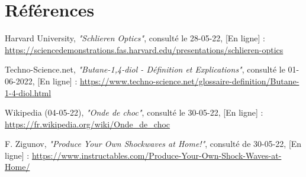 \section*{Références}
\parindent0pt
\begin{enumerate}[label = {[\arabic*]}]
	\item Harvard University, \textit{"Schlieren Optics"}, consulté le 28-05-22, [En ligne] : \small\url{https://sciencedemonstrations.fas.harvard.edu/presentations/schlieren-optics}\label{ref:harvardedu}
	\item Techno-Science.net, \textit{"Butane-1,4-diol - Définition et Explications"}, consulté le 01-06-2022, [En ligne] : \small{\url{https://www.techno-science.net/glossaire-definition/Butane-1-4-diol.html}}
	\label{ref:techno_science}
	\item Wikipedia (04-05-22), \textit{"Onde de choc"}, consulté le 30-05-22, [En ligne] : \small\url{https://fr.wikipedia.org/wiki/Onde_de_choc}
	\label{ref:wiki_choc}
	\item F. Zigunov, \textit{"Produce Your Own Shockwaves at Home!"}, consulté de 30-05-22, [En ligne] : \small\url{https://www.instructables.com/Produce-Your-Own-Shock-Waves-at-Home/}
	\label{ref:zigunov}
\end{enumerate}